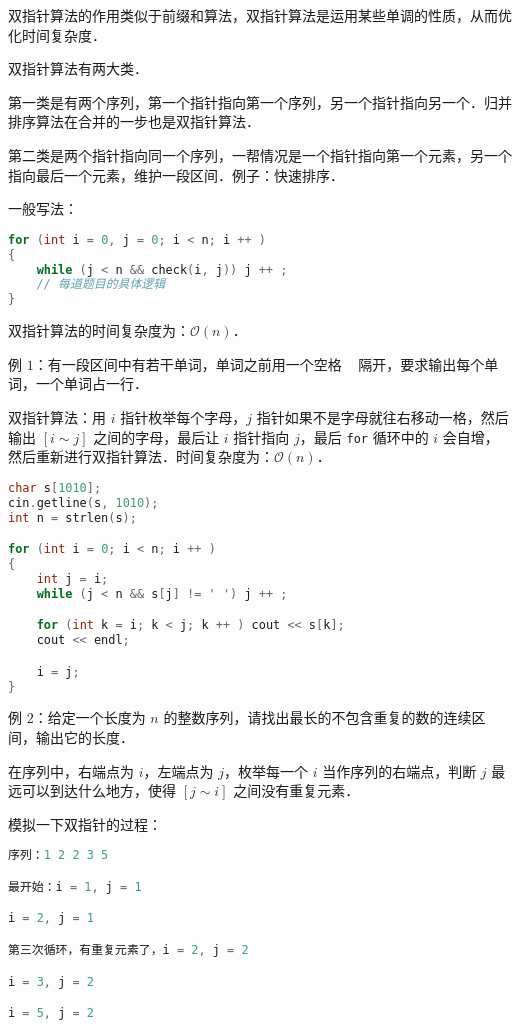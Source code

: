 
双指针算法的作用类似于前缀和算法，双指针算法是运用某些单调的性质，从而优化时间复杂度．

双指针算法有两大类．

第一类是有两个序列，第一个指针指向第一个序列，另一个指针指向另一个．归并排序算法在合并的一步也是双指针算法．

第二类是两个指针指向同一个序列，一帮情况是一个指针指向第一个元素，另一个指向最后一个元素，维护一段区间．例子：快速排序．

一般写法：

\begin{lstlisting}[language=cpp]
for (int i = 0, j = 0; i < n; i ++ )
{
    while (j < n && check(i, j)) j ++ ;
    // 每道题目的具体逻辑
}
\end{lstlisting}

双指针算法的时间复杂度为：$\mathcal{O}(n)$．

例 $1$：有一段区间中有若干单词，单词之前用一个空格 \verb| | 隔开，要求输出每个单词，一个单词占一行．

双指针算法：用 $i$ 指针枚举每个字母，$j$ 指针如果不是字母就往右移动一格，然后输出 $[i \sim j]$ 之间的字母，最后让 $i$ 指针指向 $j$，最后 \verb|for| 循环中的 $i$ 会自增，然后重新进行双指针算法．时间复杂度为：$\mathcal{O}(n)$．

\begin{lstlisting}[language=cpp]
char s[1010];
cin.getline(s, 1010);
int n = strlen(s);

for (int i = 0; i < n; i ++ )
{
    int j = i;
    while (j < n && s[j] != ' ') j ++ ;

    for (int k = i; k < j; k ++ ) cout << s[k];
    cout << endl;

    i = j;
}
\end{lstlisting}



例 $2$：给定一个长度为 $n$ 的整数序列，请找出最长的不包含重复的数的连续区间，输出它的长度．

在序列中，右端点为 $i$，左端点为 $j$，枚举每一个 $i$ 当作序列的右端点，判断 $j$ 最远可以到达什么地方，使得 $[j \sim i]$ 之间没有重复元素．

模拟一下双指针的过程：

\begin{lstlisting}[language=cpp]
序列：1 2 2 3 5

最开始：i = 1, j = 1

i = 2, j = 1

第三次循环，有重复元素了，i = 2, j = 2

i = 3, j = 2

i = 5, j = 2
\end{lstlisting}

